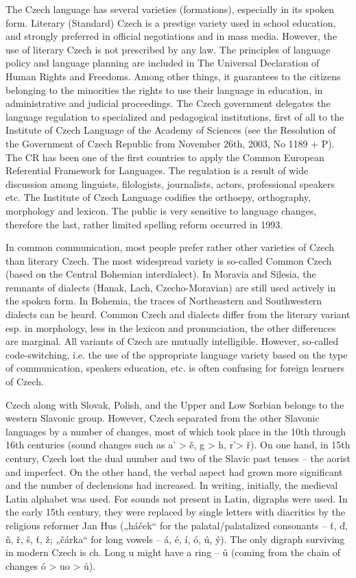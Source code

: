 \documentclass[]{../../metanetpaper}
\begin{document}
\begin{multicols}{2}
The Czech language has several varieties (formations), especially in its spoken form. Literary (Standard) Czech is a prestige variety used in school education, and strongly preferred in official negotiations and in mass media. However, the use of literary Czech is not prescribed by any law. The principles of language policy and language planning are included in The Universal Declaration of Human Rights and Freedoms. Among other things, it guarantees to the citizens belonging to the minorities the rights to use their language in education, in administrative and judicial proceedings. The Czech government delegates the language regulation to specialized and pedagogical institutions, first of all to the Institute of Czech Language of the Academy of Sciences (see the Resolution of the Government of Czech Republic from November 26th, 2003, No 1189 + P). The CR has been one of the first countries to apply the Common European Referential Framework for Languages. The regulation is a result of wide discussion among linguists, filologists, journalists, actors, professional speakers etc. The Institute of Czech Language codifies the orthoepy, orthography, morphology and lexicon. The public is very sensitive to language changes, therefore the last, rather limited spelling reform occurred in 1993.

In common communication, most people prefer rather other varieties of Czech than literary Czech. The most widespread variety is so-called Common Czech (based on the Central Bohemian interdialect). In Moravia and Silesia, the remnants of dialects (Hanak, Lach, Czecho-Moravian) are still used actively in the spoken form. In Bohemia, the traces of Northeastern and Southwestern dialects can be heard.\cite{Note3} Common Czech and dialects differ from the literary variant esp. in morphology, less in the lexicon and pronunciation, the other differences are marginal. All variants of Czech are mutually intelligible. However, so-called code-switching, i.e. the use of the appropriate language variety based on the type of communication, speakers education, etc. is often confusing for foreign learners of Czech.

Czech along with Slovak, Polish, and the Upper and Low Sorbian belongs to the western Slavonic group. However, Czech separated from the other Slavonic languages by a number of changes, most of which took place in the 10th through 16th centuries (sound changes such as a’ > ě, g > h, r’> ř). On one hand, in 15th century, Czech lost the dual number and two of the Slavic past tenses – the aorist and imperfect. On the other hand, the verbal aspect had grown more significant and the number of declensions had increased. In writing, initially, the medieval Latin alphabet was used. For sounds not present in Latin, digraphs were used. In the early 15th century, they were replaced by single letters with diacritics by the religious reformer Jan Hus („háček“ for the palatal/palatalized consonants – ť, ď, ň, ř, š, ť, ž; „čárka“ for long vowels – á, é, í, ó, ú, ý). The only digraph surviving in modern Czech is ch. Long u might have a ring – ů (coming from the chain of changes ó > uo > ů).
 

\end{multicols}
\end{document}

